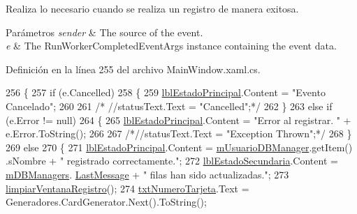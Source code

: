 Realiza lo necesario cuando se realiza un registro de manera exitosa. 


\begin{DoxyParams}{Parámetros}
{\em sender} & The source of the event.\\
\hline
{\em e} & The Run\-Worker\-Completed\-Event\-Args instance containing the event data.\\
\hline
\end{DoxyParams}


Definición en la línea 255 del archivo Main\-Window.\-xaml.\-cs.


\begin{DoxyCode}
256         \{
257             \textcolor{keywordflow}{if} (e.Cancelled)
258             \{
259                 \hyperlink{class_proyecto___integrador__3_1_1_main_window_a3120ba863f838314aeed5764404c80d5}{lblEstadoPrincipal}.Content = \textcolor{stringliteral}{"Evento Cancelado"};
260 
261              \textcolor{comment}{/*   //statusText.Text = "Cancelled";*/}
262             \}
263             \textcolor{keywordflow}{else} \textcolor{keywordflow}{if} (e.Error != null)
264             \{
265                 \hyperlink{class_proyecto___integrador__3_1_1_main_window_a3120ba863f838314aeed5764404c80d5}{lblEstadoPrincipal}.Content = \textcolor{stringliteral}{"Error al registrar. "} + e.Error.ToString();
266                 
267                 \textcolor{comment}{/*//statusText.Text = "Exception Thrown";*/}
268             \}
269             \textcolor{keywordflow}{else}
270             \{
271                 \hyperlink{class_proyecto___integrador__3_1_1_main_window_a3120ba863f838314aeed5764404c80d5}{lblEstadoPrincipal}.Content = \hyperlink{class_proyecto___integrador__3_1_1_main_window_a471acfe8f7066fc857cbc13023c10ad4}{mUsuarioDBManager}.getItem()
      .sNombre + \textcolor{stringliteral}{" registrado correctamente."};
272                 \hyperlink{class_proyecto___integrador__3_1_1_main_window_ab3c46fae3b8ee53389013b8cc0426f77}{lblEstadoSecundaria}.Content = \hyperlink{class_proyecto___integrador__3_1_1_main_window_ad2b88cf68cee145343b2da734c94d8d5}{mDBManagers}.
      \hyperlink{class_proyecto___integrador__3_1_1_d_b_managers_aecf2d3981e87f16c1e3a60c7913931a8}{LastMessage} + \textcolor{stringliteral}{" filas han sido actualizadas."};
273                 \hyperlink{class_proyecto___integrador__3_1_1_main_window_a1d010d4a4b67fd7ffd813ca7112a36c0}{limpiarVentanaRegistro}();
274                 \hyperlink{class_proyecto___integrador__3_1_1_main_window_aa002c65e1d03d58932cae92c7523198a}{txtNumeroTarjeta}.Text = Generadores.CardGenerator.Next().ToString();

\end{DoxyCode}
